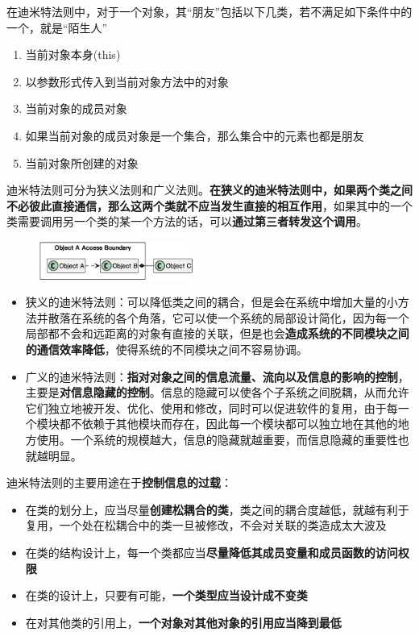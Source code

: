 在迪米特法则中，对于一个对象，其“朋友”包括以下几类，若不满足如下条件中的一个，就是“陌生人”
\begin{enumerate}[label=(\arabic*)]
    \item 当前对象本身(this)
    \item 以参数形式传入到当前对象方法中的对象
    \item 当前对象的成员对象
    \item 如果当前对象的成员对象是一个集合，那么集合中的元素也都是朋友
    \item 当前对象所创建的对象
\end{enumerate}

迪米特法则可分为狭义法则和广义法则。\textbf{在狭义的迪米特法则中，如果两个类之间不必彼此直接通信，那么这两个类就不应当发生直接的相互作用}，如果其中的一个类需要调用另一个类的某一个方法的话，可以\textbf{通过第三者转发这个调用}。
\begin{figure}[H]
    \vspace{-0.5em}
	\centering
	\includegraphics[width=0.45\textwidth]{images/狭义迪米特法则.eps}
    \vspace{-1em}
\end{figure}
\begin{itemize}
    \item 狭义的迪米特法则：可以降低类之间的耦合，但是会在系统中增加大量的小方法并散落在系统的各个角落，它可以使一个系统的局部设计简化，因为每一个局部都不会和远距离的对象有直接的关联，但是也会\textbf{造成系统的不同模块之间的通信效率降低}，使得系统的不同模块之间不容易协调。
    \item 广义的迪米特法则：\textbf{指对对象之间的信息流量、流向以及信息的影响的控制}，主要是\textbf{对信息隐藏的控制}。信息的隐藏可以使各个子系统之间脱耦，从而允许它们独立地被开发、优化、使用和修改，同时可以促进软件的复用，由于每一个模块都不依赖于其他模块而存在，因此每一个模块都可以独立地在其他的地方使用。一个系统的规模越大，信息的隐藏就越重要，而信息隐藏的重要性也就越明显。
\end{itemize}

迪米特法则的主要用途在于\textbf{控制信息的过载}：
\begin{itemize}
    \item 在类的划分上，应当尽量\textbf{创建松耦合的类}，类之间的耦合度越低，就越有利于复用，一个处在松耦合中的类一旦被修改，不会对关联的类造成太大波及
    \item 在类的结构设计上，每一个类都应当\textbf{尽量降低其成员变量和成员函数的访问权限}
    \item 在类的设计上，只要有可能，\textbf{一个类型应当设计成不变类}
    \item 在对其他类的引用上，\textbf{一个对象对其他对象的引用应当降到最低}
\end{itemize}

